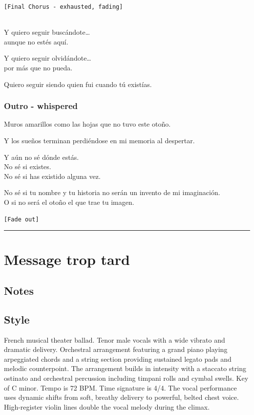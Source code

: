 \texttt{{[}Final\ Chorus\ -\ exhausted,\ fading{]}}\strut \\
Y quiero seguir buscándote\ldots{}\\
aunque no estés aquí.

Y quiero seguir olvidándote\ldots{}\\
por más que no pueda.

Quiero seguir siendo quien fui cuando tú existías.

\subsubsection{Outro - whispered}\label{outro---whispered}

Muros amarillos como las hojas que no tuvo este otoño.

Y los sueños terminan perdiéndose en mi memoria al despertar.

Y aún no sé dónde estás.\\
No sé si existes.\\
No sé si has existido alguna vez.

No sé si tu nombre y tu historia no serán un invento de mi
imaginación.\\
O si no será el otoño el que trae tu imagen.

\texttt{{[}Fade\ out{]}}

\begin{center}\rule{0.5\linewidth}{0.5pt}\end{center}

\section{Message trop tard}\label{message-trop-tard}

\subsection{Notes}\label{notes-18}

\subsection{Style}\label{style-17}

French musical theater ballad. Tenor male vocals with a wide vibrato and
dramatic delivery. Orchestral arrangement featuring a grand piano
playing arpeggiated chords and a string section providing sustained
legato pads and melodic counterpoint. The arrangement builds in
intensity with a staccato string ostinato and orchestral percussion
including timpani rolls and cymbal swells. Key of C minor. Tempo is 72
BPM. Time signature is 4/4. The vocal performance uses dynamic shifts
from soft, breathy delivery to powerful, belted chest voice.
High-register violin lines double the vocal melody during the climax.

